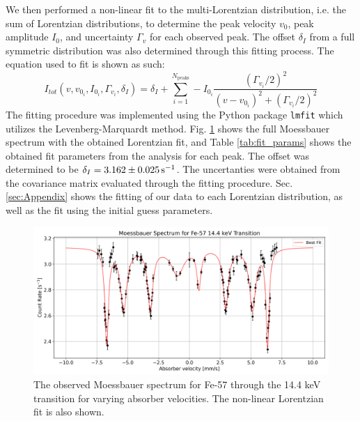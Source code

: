 \documentclass[a4paper]{report}
\numberwithin{equation}{section}
\begin{document}
We then performed a non-linear fit to the multi-Lorentzian distribution, i.e. the sum of Lorentzian
distributions, to determine the peak velocity $v_0$, peak amplitude $I_0$, and uncertainty $\Gamma_v$ for each observed peak. The 
offset $\delta_I$ from a full symmetric distribution was also determined through this fitting process. The equation used to fit
is shown as such:
\begin{equation}
    I_{tot}(v, v_{0_i}, I_{0_i}, \Gamma_{v_i}, \delta_I) = \delta_I + \sum \limits_{i=1}^{N_{\mathrm{peaks}}} - I_{0_i} \frac{(\Gamma_{v_i} / 2)^2}{(v - v_{0_i})^2 + (\Gamma_{v_i} / 2)^2}
    \label{eq:multi_lorentzian}
\end{equation}
The fitting procedure was implemented using the Python package \texttt{lmfit} which utilizes the Levenberg-Marquardt method. 
Fig. \ref{fig:moess_spect} shows the full Moessbauer spectrum with the obtained Lorentzian fit, and Table \ref{tab:fit_params} shows the obtained fit parameters from the analysis for each peak.
The offset was determined to be $\delta_I = \SI{3.162 \pm 0.025}{\per\second} $. The uncertanties were obtained from the 
covariance matrix evaluated through the fitting procedure. Sec. \ref{sec:Appendix} shows the fitting of our data 
to each Lorentzian distribution, as well as the fit using the initial guess parameters. \par 

\begin{figure}[htb!]
	\centering
	\includegraphics[width=0.8\columnwidth]{moess_spect.png}
	\caption{The observed Moessbauer spectrum for Fe-57 through the 14.4 keV transition for varying absorber velocities. The 
	non-linear Lorentzian fit is also shown.}
	\label{fig:moess_spect}
\end{figure}
\end{document}
